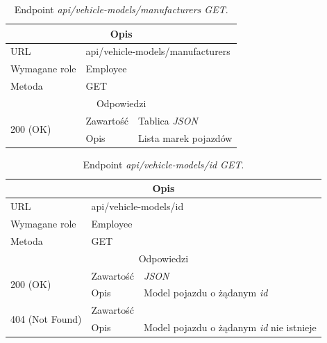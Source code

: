 \documentclass[eng,printmode,openany]{mgr}
\begin{document}
	\begin{table}[H]
		\caption{Endpoint \textit{api/vehicle-models/manufacturers GET}.}
		\begin{tabularx}{\textwidth}{|l|l|X|}
			\hline
			\multicolumn{3}{|c|}{Opis}
			
			\\ \hline
			URL                         & \multicolumn{2}{l|}{api/vehicle-models/manufacturers}
			\\ \hline
			Wymagane role               & \multicolumn{2}{l|}{Employee}
			\\ \hline
			Metoda                      & \multicolumn{2}{l|}{GET}
			\\ \hline
			\multicolumn{3}{|c|}{Odpowiedzi}
			\\ \hline
			\multirow{2}{*}{200 (OK)}   & Zawartość        & Tablica \textit{JSON}
			\\ \cline{2-3}              & Opis         	   & Lista marek pojazdów
			\\ \hline
		\end{tabularx}
	\end{table}
	
	\begin{table}[H]
		\caption{Endpoint \textit{api/vehicle-models/id GET}.}
		\begin{tabularx}{\textwidth}{|l|l|X|}
			\hline
			\multicolumn{3}{|c|}{Opis}
			\\ \hline
			URL                         & \multicolumn{2}{l|}{api/vehicle-models/id}
			\\ \hline
			Wymagane role               & \multicolumn{2}{l|}{Employee}
			\\ \hline
			Metoda                      & \multicolumn{2}{l|}{GET}
			\\ \hline
			\multicolumn{3}{|c|}{Odpowiedzi}
			\\ \hline
			\multirow{2}{*}{200 (OK)} 	        & Zawartość   	& \textit{JSON}
			\\ \cline{2-3}                      & Opis         	& Model pojazdu o żądanym \textit{id}
			\\ \hline
			\multirow{2}{*}{404 (Not Found)} 	& Zawartość     & 
			\\ \cline{2-3}                      & Opis          & Model pojazdu o żądanym \textit{id} nie istnieje
			\\ \hline
		\end{tabularx}
	\end{table}
	
\end{document}
